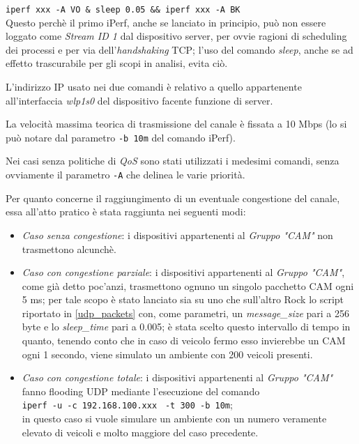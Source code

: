 \verb|iperf xxx -A VO & sleep 0.05 && iperf xxx -A BK| \\
\noindent Questo perchè il primo iPerf, anche se lanciato in principio, può non essere loggato come \textit{Stream ID 1} dal dispositivo server, per ovvie ragioni di scheduling dei processi e per via dell'\textit{handshaking} TCP; l'uso del comando \textit{sleep}, anche se ad effetto trascurabile per gli scopi in analisi, evita ciò.

L'indirizzo IP usato nei due comandi è relativo a quello appartenente all'interfaccia \textit{wlp1s0} del dispositivo facente funzione di server.

La velocità massima teorica di trasmissione del canale è fissata a 10 Mbps (lo si può notare dal parametro \verb|-b 10m| del comando iPerf).

Nei casi senza politiche di \textit{QoS} sono stati utilizzati i medesimi comandi, senza ovviamente il parametro \verb|-A| che delinea le varie priorità.

Per quanto concerne il raggiungimento di un eventuale congestione del canale, essa all'atto pratico è stata raggiunta nei seguenti modi:

\begin{itemize}
    \item \textit{Caso senza congestione}: i dispositivi appartenenti al \textit{Gruppo "CAM"} non trasmettono alcunchè.
    \item \textit{Caso con congestione parziale}: i dispositivi appartenenti al \textit{Gruppo "CAM"}, come già detto poc'anzi, trasmettono ognuno un singolo pacchetto CAM ogni 5 ms; per tale scopo è stato lanciato sia su uno che sull'altro Rock lo script riportato in \autoref{udp_packets} con, come parametri, un \textit{message\_size} pari a 256 byte e lo \textit{sleep\_time} pari a 0.005; è stata scelto questo intervallo di tempo in quanto, tenendo conto che in caso di veicolo fermo esso invierebbe un CAM ogni 1 secondo, viene simulato un ambiente con 200 veicoli presenti.
    \item \textit{Caso con congestione totale}: i dispositivi appartenenti al \textit{Gruppo "CAM"} fanno flooding UDP mediante l'esecuzione del comando \\\verb|iperf -u -c 192.168.100.xxx| \verb| -t 300 -b 10m|;\\ in questo caso si vuole simulare un ambiente con un numero veramente elevato di veicoli e molto maggiore del caso precedente.
\end{itemize}

